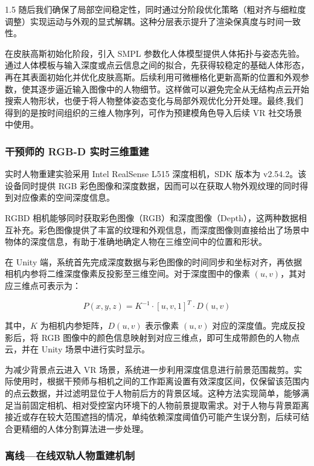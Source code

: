 \documentclass[zihao=-4]{ctexart}
\begin{document}
\begin{spacing}{1.5}
随后我们确保了局部空间稳定性，同时通过分阶段优化策略（粗对齐与细粒度调整）实现运动与外观的显式解耦。这种分层表示提升了渲染保真度与时间一致性。

在皮肤高斯初始化阶段，引入 SMPL 参数化人体模型提供人体拓扑与姿态先验。通过人体模板与输入深度或点云信息之间的拟合，先获得较稳定的基础人体形态，再在其表面初始化并优化皮肤高斯。后续利用可微栅格化更新高斯的位置和外观参数，使其逐步逼近输入图像中的人物细节。这样做可以避免完全从无结构点云开始搜索人物形状，也便于将人物整体姿态变化与局部外观优化分开处理。最终,我们得到的是按时间组织的三维人物序列，可作为预建模角色导入后续 VR 社交场景中使用。

\subsubsection{干预师的 RGB-D 实时三维重建}

实时人物重建实验采用 Intel RealSense L515 深度相机，SDK 版本为 v2.54.2。该设备同时提供 RGB 彩色图像和深度数据，因而可以在获取人物外观纹理的同时得到对应像素的空间深度信息。

RGBD 相机能够同时获取彩色图像（RGB）和深度图像（Depth），这两种数据相互补充。彩色图像提供了丰富的纹理和外观信息，而深度图像则直接给出了场景中物体的深度信息，有助于准确地确定人物在三维空间中的位置和形状\cite{ref38}。

在 Unity 端，系统首先完成深度数据与彩色图像的时间同步和坐标对齐，再依据相机内参将二维深度像素反投影至三维空间。对于深度图中的像素 $(u,v)$，其对应三维点\cite{ref39}可表示为：

\begin{equation}
P(x,y,z)=K^{-1}\cdot [u,v,1]^T\cdot D(u,v)
\end{equation}

其中，$K$ 为相机内参矩阵，$D(u,v)$ 表示像素 $(u,v)$ 对应的深度值。完成反投影后，将 RGB 图像中的颜色信息映射到对应三维点，即可生成带颜色的人物点云，并在 Unity 场景中进行实时显示。

为减少背景点云进入 VR 场景，系统进一步利用深度信息进行前景范围裁剪。实际使用时，根据干预师与相机之间的工作距离设置有效深度区间，仅保留该范围内的点云数据，并过滤明显位于人物前后方的背景区域。这种方法实现简单，能够满足当前固定相机、相对受控室内环境下的人物前景提取需求。对于人物与背景距离接近或存在较大范围遮挡的情况，单纯依赖深度阈值仍可能产生误分割，后续可结合更精细的人体分割算法进一步处理。

\subsubsection{离线—在线双轨人物重建机制}


\end{spacing}
\end{document}
